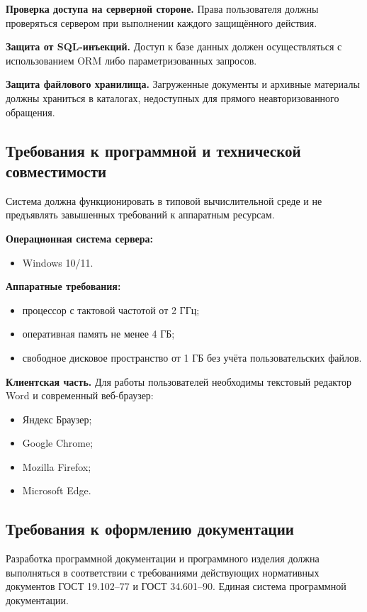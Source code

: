 \textbf{Проверка доступа на серверной стороне.}
Права пользователя должны проверяться сервером при выполнении каждого защищённого действия.

\textbf{Защита от SQL-инъекций.}
Доступ к базе данных должен осуществляться с использованием ORM либо параметризованных запросов.

\textbf{Защита файлового хранилища.}
Загруженные документы и архивные материалы должны храниться в каталогах, недоступных для прямого неавторизованного обращения.

\subsection{Требования к программной и технической совместимости}

Система должна функционировать в типовой вычислительной среде и не предъявлять завышенных требований к аппаратным ресурсам.

\textbf{Операционная система сервера:}

\begin{itemize}
	\item Windows 10/11.
\end{itemize}

\textbf{Аппаратные требования:}

\begin{itemize}
	\item процессор с тактовой частотой от 2 ГГц;
	\item оперативная память не менее 4 ГБ;
	\item свободное дисковое пространство от 1 ГБ без учёта пользовательских файлов.
\end{itemize}

\textbf{Клиентская часть.}
Для работы пользователей необходимы текстовый редактор Word и современный веб-браузер:

\begin{itemize}
	\item Яндекс Браузер;
	\item Google Chrome;
	\item Mozilla Firefox;
	\item Microsoft Edge.
\end{itemize}



\subsection{Требования к оформлению документации}

Разработка программной документации и программного изделия должна выполняться в соответствии с требованиями действующих нормативных документов ГОСТ 19.102--77 и ГОСТ 34.601--90. Единая система программной документации.